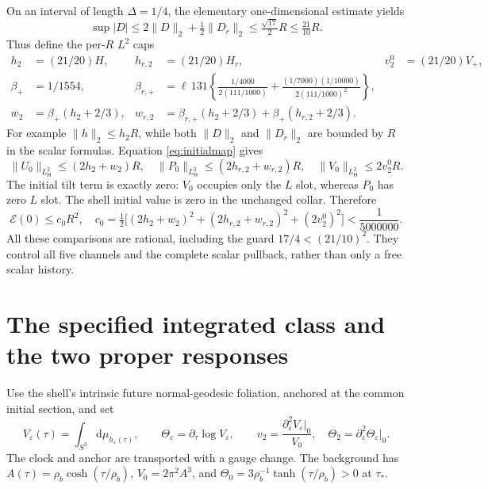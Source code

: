 \documentclass[11pt]{article}
\newcommand{\eps}{\varepsilon}
\newcommand{\dd}{\mathrm d}
\newcommand{\norm}[1]{\lVert #1\rVert}
\newcommand{\HH}{\mathsf H}
\begin{document}
On an interval of length $\Delta=1/4$, the elementary one-dimensional
estimate yields
\begin{equation}
 \sup|D|\le2\norm D_2+\tfrac12\norm{D_r}_2
       \le\tfrac{\sqrt{17}}2R\le\tfrac{21}{10}R.
 \label{eq:sobolev}
\end{equation}
Thus define the per-$R$ $L^2$ caps
\begin{align}
 h_2&=(21/20)H,& h_{r,2}&=(21/20)H_r,& v_2^0&=(21/20)V_+,\nonumber\\
 \beta_+&=1/1554,&
 \beta_{r,+}&=\ell\,131\left\{\frac{1/4000}{2(111/1000)}
       +\frac{(1/7000)(1/10000)}{2(111/1000)^2}\right\},\nonumber\\
 w_2&=\beta_+(h_2+2/3),&
 w_{r,2}&=\beta_{r,+}(h_2+2/3)+\beta_+(h_{r,2}+2/3).
 \label{eq:L2caps}
\end{align}
For example $\norm h_2\le h_2R$, while both $\norm D_2$ and
$\norm{D_r}_2$ are bounded by $R$ in the scalar formulas. Equation
\eqref{eq:initialmap} gives
\begin{equation}
 \norm{U_0}_{L^2_{\HH}}\le(2h_2+w_2)R,\quad
 \norm{P_0}_{L^2_{\HH}}\le(2h_{r,2}+w_{r,2})R,\quad
 \norm{V_0}_{L^2_{\HH}}\le2v_2^0R.
 \label{eq:Gramcaps}
\end{equation}
The initial tilt term is exactly zero: $V_0$ occupies only the $L$ slot,
whereas $P_0$ has zero $L$ slot. The shell initial value is zero in the
unchanged collar. Therefore
\begin{equation}
 \mathcal E(0)\le c_0R^2,\quad
 c_0=\tfrac12\bigl[(2h_2+w_2)^2+(2h_{r,2}+w_{r,2})^2
                                  +(2v_2^0)^2\bigr]
                         <\frac1{5000000}.
 \label{eq:E0}
\end{equation}
All these comparisons are rational, including the guard
$17/4<(21/10)^2$. They control all five channels and the complete scalar
pullback, rather than only a free scalar history.

\section{The specified integrated class and the two proper responses}

Use the shell's intrinsic future normal-geodesic foliation, anchored at
the common initial section, and set
\begin{equation}
 V_\eps(\tau)=\int_{S^3}\dd\mu_{h_\eps(\tau)},\qquad
 \Theta_\eps=\partial_\tau\log V_\eps,\qquad
 v_2=\frac{\partial_\eps^2V_\eps|_0}{V_0},\quad
 \Theta_2=\partial_\eps^2\Theta_\eps|_0.
 \label{eq:observables}
\end{equation}
The clock and anchor are transported with a gauge change.
The background has $A(\tau)=\rho_b\cosh(\tau/\rho_b)$,
$V_0=2\pi^2A^3$, and
$\Theta_0=3\rho_b^{-1}\tanh(\tau/\rho_b)>0$ at $\tau_*$.
\end{document}
